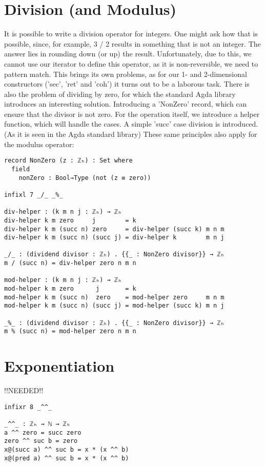\section{Division (and Modulus)}
It is possible to write a division operator for integers. One might ask how that is possible, since, for example, 3 / 2 results in something that is not an integer. The answer lies in rounding down (or up) the result. Unfortunately, due to this, we cannot use our iterator to define this operator, as it is non-reversible, we need to pattern match.
This brings its own problems, as for our 1- and 2-dimensional constructors ('sec', 'ret' and 'coh') it turns out to be a laborous task.
There is also the problem of dividing by zero, for which the standard Agda library introduces an interesting solution. Introducing a 'NonZero' record, which can ensure that the divisor is not zero.
For the operation itself, we introduce a helper function, which will handle the cases. A simple 'succ' case division is introduced. (As it is seen in the Agda standard library\cite{div-nat})
These same principles also apply for the modulus operator:
\begin{verbatim}
record NonZero (z : ℤₕ) : Set where
  field
    nonZero : Bool→Type (not (z ≡ zero))

infixl 7 _/_ _%_

div-helper : (k m n j : ℤₕ) → ℤₕ
div-helper k m zero     j        = k
div-helper k m (succ n) zero     = div-helper (succ k) m n m
div-helper k m (succ n) (succ j) = div-helper k        m n j

_/_ : (dividend divisor : ℤₕ) . {{_ : NonZero divisor}} → ℤₕ
m / (succ n) = div-helper zero n m n

mod-helper : (k m n j : ℤₕ) → ℤₕ
mod-helper k m zero      j       = k
mod-helper k m (succ n)  zero    = mod-helper zero     m n m
mod-helper k m (succ n) (succ j) = mod-helper (succ k) m n j

_%_ : (dividend divisor : ℤₕ) . {{_ : NonZero divisor}} → ℤₕ
m % (succ n) = mod-helper zero n m n
\end{verbatim}

\section{Exponentiation}
!!NEEDED!!
\begin{verbatim}
infixr 8 _^^_

_^^_ : ℤₕ → ℕ → ℤₕ
a ^^ zero = succ zero
zero ^^ suc b = zero
x@(succ a) ^^ suc b = x * (x ^^ b)
x@(pred a) ^^ suc b = x * (x ^^ b)
\end{verbatim}
